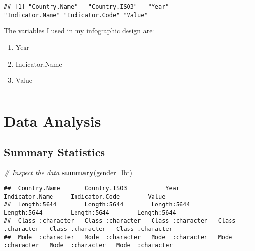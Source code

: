 \documentclass[
]{article}
\newenvironment{Shaded}{\begin{snugshade}}{\end{snugshade}}
\newcommand{\CommentTok}[1]{\textcolor[rgb]{0.56,0.35,0.01}{\textit{#1}}}
\newcommand{\FunctionTok}[1]{\textcolor[rgb]{0.13,0.29,0.53}{\textbf{#1}}}
\newcommand{\NormalTok}[1]{#1}
\providecommand{\tightlist}{%
  \setlength{\itemsep}{0pt}\setlength{\parskip}{0pt}}
\begin{document}
\begin{verbatim}
## [1] "Country.Name"   "Country.ISO3"   "Year"           "Indicator.Name" "Indicator.Code" "Value"
\end{verbatim}

The variables I used in my infographic design are:

\begin{enumerate}
\def\labelenumi{\arabic{enumi}.}
\tightlist
\item
  Year
\item
  Indicator.Name
\item
  Value
\end{enumerate}

\begin{center}\rule{0.5\linewidth}{0.5pt}\end{center}

\section{Data Analysis}\label{data-analysis}

\subsection{Summary Statistics}\label{summary-statistics}

\begin{Shaded}
\begin{Highlighting}[]
\CommentTok{\# Inspect the data}
\FunctionTok{summary}\NormalTok{(gender\_lbr)}
\end{Highlighting}
\end{Shaded}

\begin{verbatim}
##  Country.Name       Country.ISO3           Year           Indicator.Name     Indicator.Code        Value          
##  Length:5644        Length:5644        Length:5644        Length:5644        Length:5644        Length:5644       
##  Class :character   Class :character   Class :character   Class :character   Class :character   Class :character  
##  Mode  :character   Mode  :character   Mode  :character   Mode  :character   Mode  :character   Mode  :character
\end{verbatim}
\end{document}
